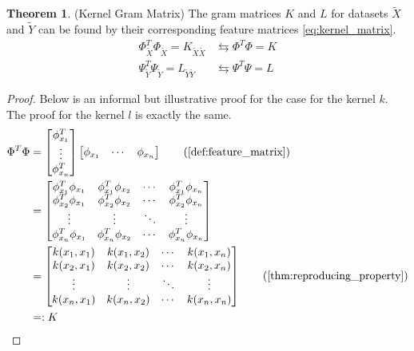 \documentclass[twoside]{article} \usepackage{aistats2017}
\theoremstyle{definition}
\newtheorem{theorem}{Theorem}[section]
\newcommand{\ds}[1]{\tilde{#1}}
\begin{document}
		\begin{theorem} \label{thm:kernel_matrix}
			(Kernel Gram Matrix)
			The gram matrices $K$ and $L$ for datasets $\ds{X}$ and $\ds{Y}$ can be found by their corresponding feature matrices \eqref{eq:kernel_matrix}.
			\begin{equation}
			\begin{aligned}
				\Phi_{\ds{X}}^{T} \Phi_{\ds{X}} = K_{\ds{X} \ds{X}} &\leftrightarrows \Phi^{T} \Phi = K \\
				\Psi_{\ds{Y}}^{T} \Psi_{\ds{Y}} = L_{\ds{Y} \ds{Y}} &\leftrightarrows \Psi^{T} \Psi = L
			\label{eq:kernel_matrix}
			\end{aligned}
			\end{equation}
			


			\begin{proof}
				Below is an informal but illustrative proof for the case for the kernel $k$. The proof for the kernel $l$ is exactly the same.
				\begin{align*}
					\Phi^{T} \Phi &= \begin{bmatrix} \phi_{x_{1}}^{T} \\ \vdots \\ \phi_{x_{n}}^{T} \end{bmatrix} \begin{bmatrix} \phi_{x_{1}} & \cdots & \phi_{x_{n}} \end{bmatrix} \tag{\cref{def:feature_matrix}}\\ 
					&= 	\begin{bmatrix}
							\phi_{x_{1}}^{T} \phi_{x_{1}} & \phi_{x_{1}}^{T} \phi_{x_{2}} & \cdots & \phi_{x_{1}}^{T} \phi_{x_{n}} \\
							\phi_{x_{2}}^{T} \phi_{x_{1}} & \phi_{x_{2}}^{T} \phi_{x_{2}} & \cdots & \phi_{x_{2}}^{T} \phi_{x_{n}} \\
							\vdots & \vdots & \ddots & \vdots \\
							\phi_{x_{n}}^{T} \phi_{x_{1}} & \phi_{x_{n}}^{T} \phi_{x_{2}} & \cdots & \phi_{x_{n}}^{T} \phi_{x_{n}} \\
						\end{bmatrix} \\
					&= 	\begin{bmatrix}
							k(x_{1}, x_{1}) & k(x_{1}, x_{2}) & \cdots & k(x_{1}, x_{n}) \\
							k(x_{2}, x_{1}) & k(x_{2}, x_{2}) & \cdots & k(x_{2}, x_{n}) \\
							\vdots & \vdots & \ddots & \vdots \\
							k(x_{n}, x_{1}) & k(x_{n}, x_{2}) & \cdots & k(x_{n}, x_{n}) \\
						\end{bmatrix} \tag{\cref{thm:reproducing_property}} \\
					&=: K
				\end{align*}
			\end{proof}
		\end{theorem}
		
\end{document}
